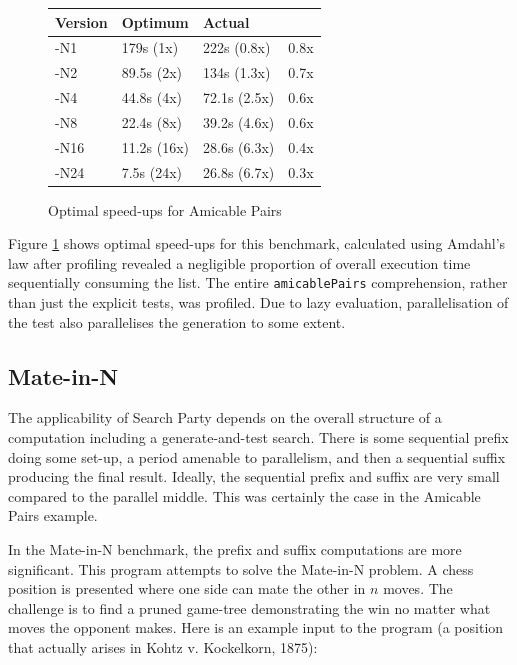\begin{figure}[t]
  \centering
  \begin{tabularx}{\linewidth}{|X|X|X|X|}
    \hline \textbf{Version} & \textbf{Optimum} & \textbf{Actual} & \\
    \hline -N1  & 179s (1x)   & 222s (0.8x)  & 0.8x \\
           -N2  & 89.5s (2x)  & 134s (1.3x)  & 0.7x \\
           -N4  & 44.8s (4x)  & 72.1s (2.5x) & 0.6x \\
           -N8  & 22.4s (8x)  & 39.2s (4.6x) & 0.6x \\
           -N16 & 11.2s (16x) & 28.6s (6.3x) & 0.4x \\
           -N24 & 7.5s  (24x) & 26.8s (6.7x) & 0.3x \\
    \hline
  \end{tabularx}
  \caption{Optimal speed-ups for Amicable Pairs}
  \label{fig:searchparty-examples-amis-amdahl}
\end{figure}

Figure \ref{fig:searchparty-examples-amis-amdahl} shows optimal
speed-ups for this benchmark, calculated using Amdahl's law after
profiling revealed a negligible proportion of overall execution time
sequentially consuming the list. The entire \verb|amicablePairs|
comprehension, rather than just the explicit tests, was profiled. Due
to lazy evaluation, parallelisation of the test also parallelises the
generation to some extent.

\subsection*{Mate-in-N}
\label{sec:searchparty-examples-mate}

The applicability of Search Party depends on the overall structure of
a computation including a generate-and-test search. There is some
sequential prefix doing some set-up, a period amenable to parallelism,
and then a sequential suffix producing the final result. Ideally, the
sequential prefix and suffix are very small compared to the parallel
middle. This was certainly the case in the Amicable Pairs example.

In the Mate-in-N benchmark, the prefix and suffix computations are
more significant. This program attempts to solve the Mate-in-N
problem. A chess position is presented where one side can mate the
other in $n$ moves. The challenge is to find a pruned game-tree
demonstrating the win no matter what moves the opponent makes. Here is
an example input to the program (a position that actually arises in
Kohtz v. Kockelkorn, 1875):

